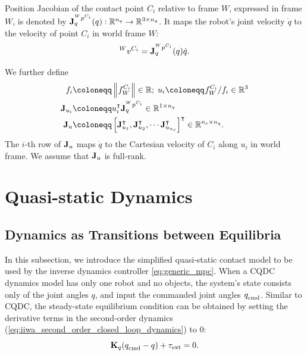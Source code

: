 Position Jacobian of the contact point $C_i$ relative to frame $W$, expressed in frame $W$, is denoted by $\mb{J}_{q}^{\quantity{p}{W}{C_i}{}}(q) : \mathbb{R}^{n_q} \rightarrow \mathbb{R}^{3 \times n_q}$. It maps the robot's joint velocity $\Dot{q}$ to the velocity of point $C_i$ in world frame $W$:
\begin{equation}
\quantity{v}{W}{C_i}{} = \mb{J}_{q}^{\quantity{p}{W}{C_i}{}}(q) \Dot{q}.
\end{equation}

We further define
\begin{subequations}
\label{eq:contact_definitions}
\begin{align}
f_i  &\coloneqq \norm{\quantity{f}{}{C_i}{W}} \in \mathbb{R};  \;  u_i \coloneqq \quantity{f}{}{C_i}{W} / f_i \in \mathbb{R}^3\\
\mb{J}_{u_i} &\coloneqq u_i^{\intercal} \mb{J}_{q}^{\quantity{p}{W}{C_i}{}} \in \mathbb{R}^{1 \times n_q}\\
\mb{J}_u &\coloneqq \left[\mb{J}_{u_1}^\intercal, \mb{J}_{u_2}^\intercal, \cdots \mb{J}_{u_{n_c}}^\intercal \right]^\intercal \in \mathbb{R}^{n_c \times n_q}. \label{eq:contact_jacobian}
\end{align}
\end{subequations}
The $i$-th row of $\mb{J}_u$ maps $\Dot{q}$ to the Cartesian velocity of $C_i$ along $u_i$ in world frame. We assume that $\mb{J}_u$ is full-rank.


\section{Quasi-static Dynamics}
\subsection{Dynamics as Transitions between Equilibria \label{sec:quasistatic_dynamics_1}}
In this subsection, we introduce the simplified quasi-static contact model to be used by the inverse dynamics controller \eqref{eq:generic_mpc}. 
When a CQDC dynamics model has only one robot and no objects, the system's state consists only of the joint angles $q$, and input the commanded joint angles $\qcmd$. 
Similar to CQDC, the steady-state equilibrium condition can be obtained by setting the derivative terms in the second-order dynamics (\ref{eq:iiwa_second_order_closed_loop_dynamics}) to 0:
\begin{equation}
\label{eq:quaistatic_force_balance}
\mb{K}_q (\qcmd - q) + \tauE = 0. 
\end{equation}

